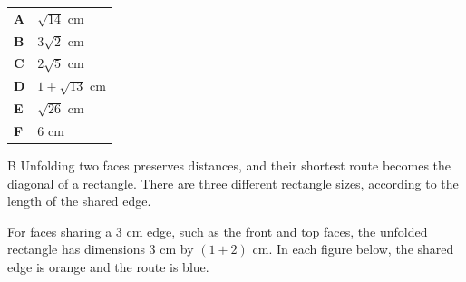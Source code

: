 \documentclass[11pt,a4paper]{article}
\begin{document}
\begin{enumerate}[label=\textbf{\arabic*.},leftmargin=*,itemsep=0pt,start=8]
\par\vspace*{12pt}
\begin{tabularx}{\linewidth}{@{}>{\bfseries}l Y@{}}
A &
$\sqrt{14}$ cm
\\[0.8em]
B &
$3\sqrt{2}$ cm
\\[0.8em]
C &
$2\sqrt{5}$ cm
\\[0.8em]
D &
$1+\sqrt{13}$ cm
\\[0.8em]
E &
$\sqrt{26}$ cm
\\[0.8em]
F &
$6$ cm
\\
\end{tabularx}

\begin{djsSolution}{B}
Unfolding two faces preserves distances, and their shortest route becomes the diagonal of a rectangle. There are three different rectangle sizes, according to the length of the shared edge.

For faces sharing a $3\text{ cm}$ edge, such as the front and top faces, the unfolded rectangle has dimensions $3\text{ cm}$ by $(1+2)\text{ cm}$. In each figure below, the shared edge is orange and the route is blue.

\begin{djsSolutionFigure}
\end{djsSolutionFigure}
\end{djsSolution}
\end{enumerate}
\end{document}
